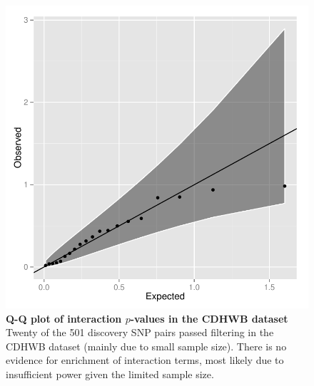 \documentclass{article}
\begin{document}
\begin{figure}
	\centering
	\includegraphics[width=5in]{qqgg}
	\caption{\textbf{Q-Q plot of interaction $p$-values in the CDHWB dataset} Twenty of the 501 discovery SNP pairs passed filtering in the CDHWB dataset (mainly due to small sample size). There is no evidence for enrichment of interaction terms, most likely due to insufficient power given the limited sample size.}
	\label{fig:qqgg}
\end{figure}
\clearpage
\end{document}
